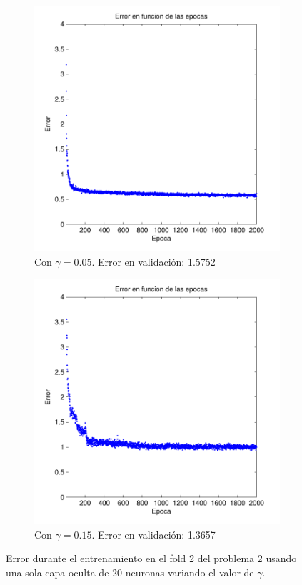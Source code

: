 \documentclass[informe.tex]{subfiles}
\begin{document}
\begin{figure}[H]
        \begin{subfigure}[b]{0.49\textwidth}
                \includegraphics[width=\textwidth]{graficos/error_fold2_20_binary-regresion_2000_005.pdf}
                \caption{Con $\gamma=0.05$. Error en validación: 1.5752}
                \label{fig:d2-f2-2k-005-n20}
        \end{subfigure}
        \begin{subfigure}[b]{0.49\textwidth}
                \includegraphics[width=\textwidth]{graficos/error_fold2_20_binary-regresion_2000_015.pdf}
                \caption{Con $\gamma=0.15$. Error en validación: 1.3657}
                \label{fig:d2-f2-2k-015-n20}
        \end{subfigure}
        
        \caption{Error durante el entrenamiento en el fold 2 del problema 2 usando una sola capa oculta de 20 neuronas variando el valor de $\gamma$.}\label{fig:p2-f2-gammasVarios}
    \end{figure}
    
    
\end{document}
